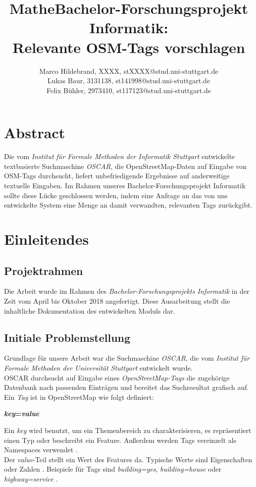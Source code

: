 \documentclass[12pt,pdftex,a4paper]{article}
\title{Mathe}
\begin{document}
\title{Bachelor-Forschungsprojekt Informatik:\\Relevante OSM-Tags vorschlagen}
\author{Marco Hildebrand, XXXX, stXXXX@stud.uni-stuttgart.de\\
		Lukas Baur, 3131138, st141998@stud.uni-stuttgart.de\\
		Felix Bühler, 2973410, st117123@stud.uni-stuttgart.de}
\maketitle

\section*{Abstract}
Die vom \textit{Institut für Formale Methoden der Informatik Stuttgart} entwickelte textbasierte Suchmaschine \textit{OSCAR}, die OpenStreetMap-Daten auf Eingabe von OSM-Tags durchsucht, liefert unbefriedigende Ergebnisse auf anderweitige textuelle Eingaben. 
Im Rahmen unseres Bachelor-Forschungsprojekt Informatik sollte diese Lücke geschlossen werden, indem eine Anfrage an das von uns entwickelte System eine Menge an damit verwandten, relevanten Tags zurückgibt.

\pagebreak

\section{Einleitendes}
\subsection{Projektrahmen}
Die Arbeit wurde im Rahmen des \textit{Bachelor-Forschungsprojekts Informatik} in der Zeit vom April bis Oktober 2018 angefertigt. Diese Ausarbeitung stellt die inhaltliche Dokumentation des entwickelten Moduls dar.
\subsection{Initiale Problemstellung}
Grundlage für unsere Arbeit war die Suchmaschine \textit{OSCAR}, die vom \textit{Institut für Formale Methoden der Universität Stuttgart} entwickelt wurde.\\
OSCAR durchsucht auf Eingabe eines \textit{OpenStreetMap-Tags} die  zugehörige Datenbank nach passenden Einträgen und bereitet das Suchresultat grafisch auf. Ein \textit{Tag} ist in OpenStreetMap wie folgt definiert:
\begin{center}
	\textbf{\textit{key}=\textit{value}}
\end{center}
Ein \textit{key} wird benutzt, um ein Themenbereich zu charakterisieren, es repräsentiert einen Typ oder beschreibt ein Feature. Außerdem werden Tags vereinzelt als Namespaces verwendet \cite{keyDescription}.\\
Der \textit{value}-Teil stellt ein Wert des Features da. Typische Werte sind Eigenschaften oder Zahlen \cite{keyDescription}.
Beispiele für Tags sind \textit{building=yes}, \textit{building=house} oder  \textit{highway=service} \cite{example1}\cite{example2}.\\
\end{document}

